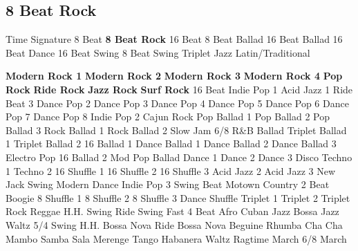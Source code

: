 \subsection{8 Beat Rock}
Time Signature
8 Beat
\textbf{8 Beat Rock}
16 Beat
8 Beat Ballad
16 Beat Ballad
16 Beat Dance
16 Beat Swing
8 Beat Swing
Triplet
Jazz
Latin/Traditional





























\textbf{Modern Rock 1}
\textbf{Modern Rock 2}
\textbf{Modern Rock 3}
\textbf{Modern Rock 4}
\textbf{Pop Rock}
\textbf{Ride Rock}
\textbf{Jazz Rock}
\textbf{Surf Rock}
16 Beat
Indie Pop 1
Acid Jazz 1
Ride Beat 3
Dance Pop 2
Dance Pop 3
Dance Pop 4
Dance Pop 5
Dance Pop 6
Dance Pop 7
Dance Pop 8
Indie Pop 2
Cajun Rock
Pop Ballad 1
Pop Ballad 2
Pop Ballad 3
Rock Ballad 1
Rock Ballad 2
Slow Jam
6/8 R\&B Ballad
Triplet Ballad 1
Triplet Ballad 2
16 Ballad 1
Dance Ballad 1
Dance Ballad 2
Dance Ballad 3
Electro Pop
16 Ballad 2
Mod Pop Ballad
Dance 1
Dance 2
Dance 3
Disco
Techno 1
Techno 2
16 Shuffle 1
16 Shuffle 2
16 Shuffle 3
Acid Jazz 2
Acid Jazz 3
New Jack Swing
Modern Dance
Indie Pop 3
Swing Beat
Motown
Country 2 Beat
Boogie
8 Shuffle 1
8 Shuffle 2
8 Shuffle 3
Dance Shuffle
Triplet 1
Triplet 2
Triplet Rock
Reggae
H.H. Swing
Ride Swing
Fast 4 Beat
Afro Cuban
Jazz Bossa
Jazz Waltz
5/4 Swing
H.H. Bossa Nova
Ride Bossa Nova
Beguine
Rhumba
Cha Cha
Mambo
Samba
Sala
Merenge
Tango
Habanera
Waltz
Ragtime
March
6/8 March
